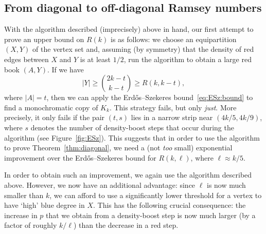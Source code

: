 \documentclass[12pt,reqno]{amsart}
\theoremstyle{definition}
\theoremstyle{remark}
\renewcommand{\ge}{\geqslant}
\begin{document}

 
 


\subsection{From diagonal to off-diagonal Ramsey numbers}\label{diag:chat:sec}

With the algorithm described (imprecisely) above in hand, our first attempt to prove an upper bound on $R(k)$ is as follows: we choose an equipartition $(X,Y)$ of the vertex set and, assuming (by symmetry) that the density of red edges between $X$ and $Y$ is at least $1/2$, run the algorithm to obtain a large red book $(A,Y)$. If we have %
$$|Y| \ge {2k - t \choose k-t} \ge R(k,k-t),$$ 
where $|A| = t$, then we can apply the Erd\H{o}s--Szekeres bound~\eqref{eq:ESz:bound} to find a monochromatic copy of $K_k$. This strategy fails, but only \emph{just}. More precisely, it only fails if the pair $(t,s)$ lies in a narrow strip near $(4k/5,4k/9)$, where $s$ denotes the number of density-boost steps that occur during the algorithm (see Figure~\ref{fig:ESz}). This suggests that in order to use the algorithm to prove Theorem~\ref{thm:diagonal}, we need a (not \emph{too} small) exponential improvement over the Erd\H{o}s--Szekeres bound for $R(k,\ell)$, where $\ell \approx k/5$. 

In order to obtain such an improvement, we again use the algorithm described above. However, we now have an additional advantage: since $\ell$ is now much smaller than $k$, we can afford to use a significantly lower threshold for a vertex to have `high' blue degree in $X$. This has the following crucial consequence: the increase in $p$ that we obtain from a density-boost step is now much larger (by a factor of roughly $k/\ell$) than the decrease in a red step.
\end{document}
